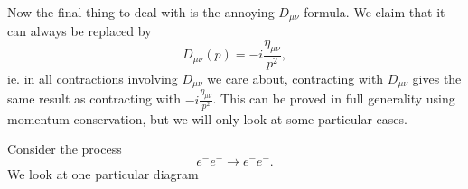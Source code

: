 \documentclass[a4paper]{article}
\begin{document}
Now the final thing to deal with is the annoying $D_{\mu\nu}$ formula. We claim that it can always be replaced by
\[
  D_{\mu\nu}(p) = -i \frac{\eta_{\mu\nu}}{p^2},
\]
ie. in all contractions involving $D_{\mu\nu}$ we care about, contracting with $D_{\mu\nu}$ gives the same result as contracting with $-i \frac{\eta_{\mu\nu}}{p^2}$. This can be proved in full generality using momentum conservation, but we will only look at some particular cases.

\begin{eg}
  Consider the process
  \[
    e^- e^- \to e^- e^-.
  \]
  We look at one particular diagram
  \begin{center}
\end{center}
\end{eg}
\end{document}
